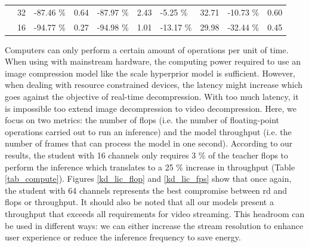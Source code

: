\begin{table}[]
\begin{tabular}{|c|c|lr|lr|lr|lr|}
                                 & 32                                                           & {\color[HTML]{656565} -87.46 \%}                 & 0.64                                     & {\color[HTML]{656565} -87.97 \%}               & 2.43  & {\color[HTML]{656565} -5.25 \%}  & 32.71 & {\color[HTML]{656565} -10.73 \%} & 0.60 \\ \cline{2-10} 
                                 & 16                                                           & {\color[HTML]{656565} -94.77 \%}                 & 0.27                                     & {\color[HTML]{656565} -94.98 \%}               & 1.01  & {\color[HTML]{656565} -13.17 \%} & 29.98 & {\color[HTML]{656565} -32.44 \%} & 0.45 \\ \hline
    \end{tabular}
\end{table}

Computers can only perform a certain amount of operations per unit of time. When using with mainstream hardware, the computing power required to use an image compression model like the scale hyperprior model is sufficient. However, when dealing with resource constrained devices, the latency might increase which goes against the objective of real-time decompression. With too much latency, it is impossible too extend image decompression to video decompression. Here, we focus on two metrics: the number of \acrfull{flop}s (i.e. the number of floating-point operations carried out to run an inference) and the model throughput (i.e. the number of frames that can process the model in one second). According to our results, the student with 16 channels only requires 3 \% of the teacher \acrshort{flop}s to perform the inference which translates to a 25 \% increase in throughput (Table \ref{tab_compute}). Figures \ref{kd_lic_flop} and \ref{kd_lic_fps} show that once again, the student with 64 channels represents the best compromise between \acrshort{rd} and \acrshort{flop}s or throughput. It should also be noted that all our models present a throughput that exceeds all requirements for video streaming. This headroom can be used in different ways: we can either increase the stream resolution to enhance user experience or reduce the inference frequency to save energy. 

